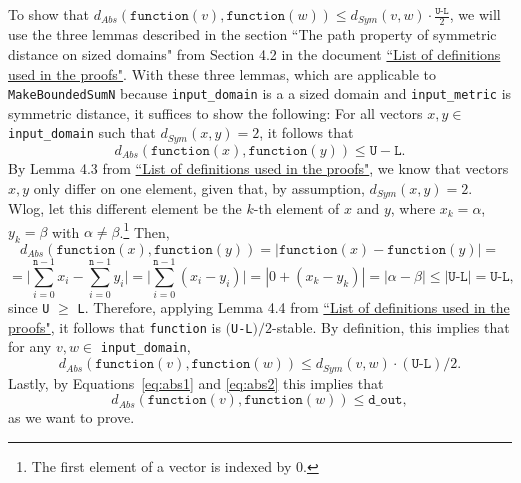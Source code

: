 \documentclass[11pt,a4paper]{article}
\theoremstyle{definition}
\newcommand{\dout}{\texttt{d\_out}}
\newcommand{\function}{\texttt{function}}
\newcommand{\silvia}[1]{{ {\color{blue}{(silvia)~#1}}}}
\begin{document}
To show that $d_{Abs}(\function(v), \function(w)) \leq d_{Sym}(v, w) \cdot \frac{\texttt{U-L}}{2}$, we will use the three lemmas described in the section ``The path property of symmetric distance on sized domains" from Section 4.2 in the document \href{https://www.overleaf.com/project/60d214e390b337703d200982}{``List of definitions used in the proofs"}. With these three lemmas, which are applicable to \texttt{MakeBoundedSumN} because \texttt{input\_domain} is a a sized domain and \texttt{input\_metric} is symmetric distance, it suffices to show the following: For all vectors $x, y \in$ \texttt{input\_domain} such that $d_{Sym}(x, y) = 2$, it follows that 
\[
d_{Abs}(\texttt{function}(x), \texttt{function}(y)) \leq \texttt{U} - \texttt{L}.
\]
By Lemma 4.3 from \href{https://www.overleaf.com/project/60d214e390b337703d200982}{``List of definitions used in the proofs"}, we know that vectors $x, y$ only differ on one element, given that, by assumption, $d_{Sym}(x, y) = 2$. Wlog, let this different element be the $k$-th element of $x$ and $y$, where $x_k = \alpha$, $y_k = \beta$ with $\alpha \neq \beta$.\footnote{The first element of a vector is indexed by 0.} Then,
\[
    d_{Abs}(\texttt{function}(x), \texttt{function}(y)) = |\texttt{function}(x) - \texttt{function}(y)| = 
\]
\[
    = \Big|\sum_{i=0}^{\texttt{n}-1}x_i - \sum_{i=0}^{\texttt{n}-1}y_i\Big| = \Big| \sum_{i=0}^{\texttt{n}-1} (x_i - y_i) \Big| = |0 + (x_k - y_k)| = |\alpha - \beta| \leq |\texttt{U-L}| = \texttt{U-L},
\]
since \texttt{U} $\geq$ \texttt{L}. Therefore, applying Lemma 4.4 from \href{https://www.overleaf.com/project/60d214e390b337703d200982}{``List of definitions used in the proofs"}, it follows that \texttt{function} is $($\texttt{U-L}$)/2$-stable. By definition, this implies that for any $v, w \in$ \texttt{input\_domain},
\[
    d_{Abs}(\texttt{function}(v), \texttt{function}(w)) \leq d_{Sym}(v, w) \cdot (\texttt{U-L})/2.
\]
Lastly, by Equations~\ref{eq:abs1} and \ref{eq:abs2} this implies that
\[
    d_{Abs}(\function(v), \function(w)) \leq \dout,
\]
as we want to prove.

\silvia{Flag: this will be updated to the more general notion of path property (through shortest path metric on a graph), but this matches the current version of the proofs document.}

\silvia{Flag: need to account for rounding errors in the stability relation given the non-closure of float addition, as discussed on the week of August 2nd. We are figuring this out.}

\newpage
\end{document}

